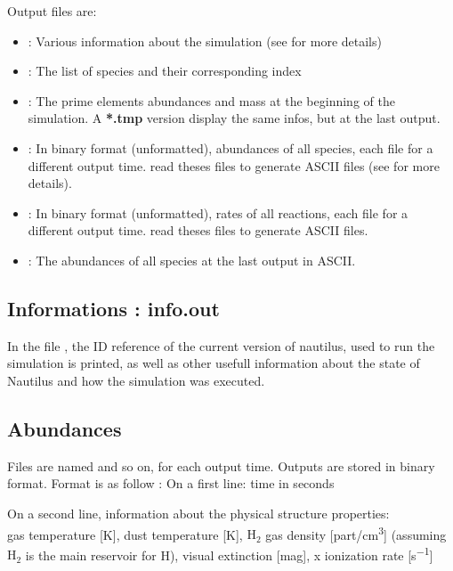 \documentclass[english,a4paper,twoside]{article}
\newcommand{\molecule}[1]{\ensuremath{\mathrm{#1}}}
\begin{document}
Output files are:
\begin{itemize}
\item {}: Various information about the simulation (see  for more details)
\item {}: The list of species and their corresponding index
\item {}: The prime elements abundances and mass at the beginning of the simulation. A \textbf{*.tmp} version display the same infos, but at the last output.
\item {}: In binary format (unformatted), abundances of all species, each file for a different output time.  read theses files to generate ASCII files (see  for more details).
\item {}: In binary format (unformatted), rates of all reactions, each file for a different output time.  read theses files to generate ASCII files.
\item {}: The abundances of all species at the last output in ASCII.
\end{itemize}

\subsection{Informations : info.out}\label{sec:info-out}
In the file , the ID reference of the current version of nautilus, used to run the simulation is printed, as well as other usefull information about the state of Nautilus and how the simulation was executed.

\subsection{Abundances}\label{sec:abundances}
Files are named  and so on, for each output time. Outputs are stored in binary format. Format is as follow : 
On a first line: time in seconds

On a second line, information about the physical structure properties: \\
gas temperature [\unit{K}], dust temperature [\unit{K}], \molecule{H_2} gas density [\unit{part/cm^3}] (assuming \molecule{H_2} is the main reservoir for H), visual extinction [\unit{mag}], x ionization rate [\unit{s^{-1}}]
\end{document}
